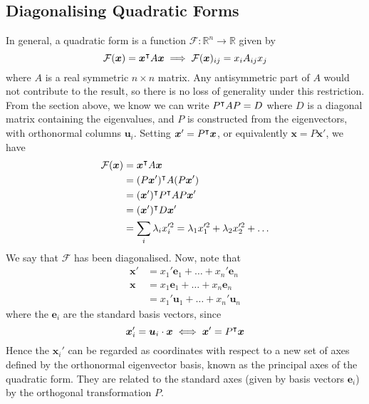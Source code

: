 \documentclass{article}
\begin{document}
	\subsection{Diagonalising Quadratic Forms}
	In general, a quadratic form is a function $\mathcal F\colon \mathbb R^n \to \mathbb R$ given by
	\[ \mathcal F(\bm x) = \bm x^\intercal A \bm x \implies \mathcal F(\bm x)_{ij} = x_i A_{ij} x_j \]
	where $A$ is a real symmetric $n \times n$ matrix. Any antisymmetric part of $A$ would not contribute to the result, so there is no loss of generality under this restriction. From the section above, we know we can write $P^\intercal A P = D$ where $D$ is a diagonal matrix containing the eigenvalues, and $P$ is constructed from the eigenvectors, with orthonormal columns $\bm u_i$. Setting $\bm x' = P^\intercal \bm x$, or equivalently $\bm x = P \bm x'$, we have
	\begin{align*}
		\mathcal F(\bm x) &= \bm x^\intercal A \bm x \\
		&= (P \bm x')^\intercal A (P \bm x') \\
		&= (\bm x')^\intercal P^\intercal A P \bm x' \\
		&= (\bm x')^\intercal D \bm x' \\
		&= \sum_i \lambda_i x_i'^2 = \lambda_1 x_1'^2 + \lambda_2 x_2'^2 + \dots
	\end{align*}
	We say that $\mathcal F$ has been diagonalised. Now, note that
	\begin{align*}
		\bm x' &= x_1'\bm e_1 + \dots + x_n'\bm e_n \\
		\bm x &= x_1\bm e_1 + \dots + x_n\bm e_n \\
		&= x_1'\bm u_1 + \dots + x_n'\bm u_n
	\end{align*}
	where the $\bm e_i$ are the standard basis vectors, since
	\[ \bm x_i' = \bm u_i \cdot \bm x \iff \bm x' = P^\intercal \bm x \]
	Hence the $\bm x_i'$ can be regarded as coordinates with respect to a new set of axes defined by the orthonormal eigenvector basis, known as the principal axes of the quadratic form. They are related to the standard axes (given by basis vectors $\bm e_i$) by the orthogonal transformation $P$.
\end{document}
